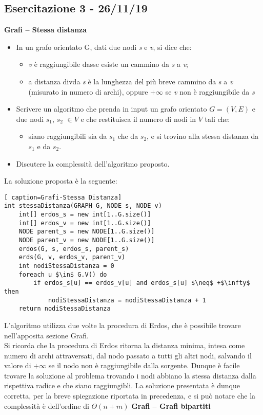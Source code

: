 \documentclass[../cheatSheetAlgoritmi.tex]{subfiles}
\begin{document}
\subsection{Esercitazione 3 - 26/11/19}
\textbf{Grafi – Stessa distanza}

\begin{itemize}
\item In un grafo orientato G, dati due nodi \textit{s} e \textit{v}, si dice che:
	\begin{itemize}
		\item \textit{v} è raggiungibile dasse esiste un cammino da \textit{s} a \textit{v};
		\item a distanza divda \textit{s} è la lunghezza del più breve cammino da \textit{s} a \textit{v} (misurato in numero di archi), oppure $+\infty$ se \textit{v} non è raggiungibile da \textit{s}
	\end{itemize}
	
	\item Scrivere un algoritmo che prenda in input un grafo orientato $G=(V, E)$ e due nodi $s_1$, $s_2$ $\in V$ e che restituisca il numero di nodi in $V$ tali che:
	\begin{itemize}
		\item siano raggiungibili sia da $s_1$ che da $s_2$, e si trovino alla stessa distanza da $s_1$ e da $s_2$.
	\end{itemize}
	\item Discutere la complessità dell’algoritmo proposto.
\end{itemize}
La soluzione proposta è la seguente:
\begin{lstlisting}[ caption=Grafi-Stessa Distanza]
int stessaDistanza(GRAPH G, NODE s, NODE v)
	int[] erdos_s = new int[1..G.size()]
  	int[] erdos_v = new int[1..G.size()]
  	NODE parent_s = new NODE[1..G.size()]
 	NODE parent_v = new NODE[1..G.size()]
 	erdos(G, s, erdos_s, parent_s)
 	erds(G, v, erdos_v, parent_v)
  	int nodiStessaDistanza = 0
  	foreach u $\in$ G.V() do
    	if erdos_s[u] == erdos_v[u] and erdos_s[u] $\neq$ +$\infty$ then
      		nodiStessaDistanza = nodiStessaDistanza + 1
  	return nodiStessaDistanza
\end{lstlisting}
L'algoritmo utilizza due volte la procedura di Erdos, che è possibile trovare nell'apposita sezione Grafi. \\ Si ricorda che la procedura di Erdos ritorna la distanza minima, intesa come numero di archi attraversati, dal nodo passato a tutti gli altri nodi, salvando il valore di $+\infty$ se il nodo non è raggiungibile dalla sorgente. Dunque è facile trovare la soluzione al problema trovando i nodi abbiano la stessa distanza dalla rispettiva radice e che siano raggiungibli.
La soluzione presentata è dunque corretta, per la breve spiegazione riportata in precedenza, e si può notare che la complessità è dell'ordine di $\Theta(n + m)$ 
\newpage
\textbf{Grafi – Grafi bipartiti}
\end{document}
